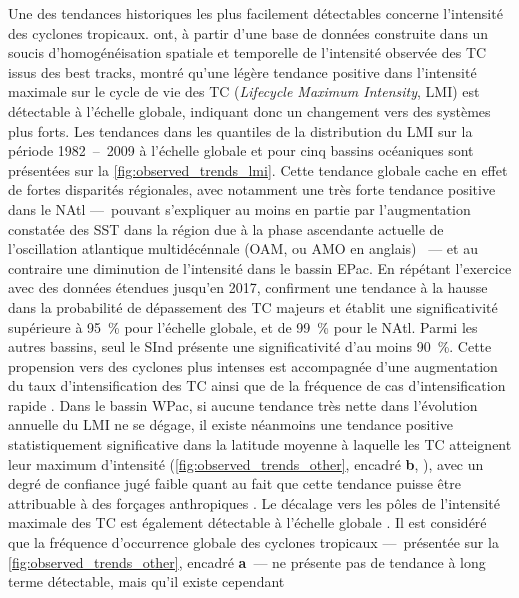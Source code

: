 \documentclass[../main.tex]{subfiles}
\begin{document}
Une des tendances historiques les plus facilement détectables concerne l'intensité des cyclones tropicaux. \textcite{kossin_trend_2013} ont, à partir d'une base
de données construite dans un soucis d'homogénéisation spatiale et temporelle de l'intensité observée des TC issus des best tracks, montré qu'une légère
tendance positive dans l'intensité maximale sur le cycle de vie des TC (\textit{Lifecycle Maximum Intensity}, LMI) est détectable à l'échelle globale, indiquant
donc un changement vers des systèmes plus forts. Les tendances dans les quantiles de la distribution du LMI sur la période \num{1982}~--~\num{2009} à l'échelle
globale et pour cinq bassins océaniques sont présentées sur la \cref{fig:observed_trends_lmi}. Cette tendance globale cache en effet de fortes disparités
régionales, avec notamment une très forte tendance positive dans le NAtl ---~pouvant s'expliquer au moins en partie par l'augmentation constatée des SST dans la
région due à la phase ascendante actuelle de l'oscillation atlantique multidécénnale (OAM, ou AMO en anglais) \parencite{ting_forced_2009}~--- et au contraire
une diminution de l'intensité dans le bassin EPac. En répétant l'exercice avec des données étendues jusqu'en \num{2017}, \textcite{kossin_global_2020} confirment
une tendance à la hausse dans la probabilité de dépassement des TC majeurs et établit une significativité supérieure à \SI{95}{\percent} pour l'échelle globale,
et de \SI{99}{\percent} pour le NAtl. Parmi les autres bassins, seul le SInd présente une significativité d'au moins \SI{90}{\percent}. Cette propension vers
des cyclones plus intenses est accompagnée d'une augmentation du taux d'intensification des TC ainsi que de la fréquence de cas d'intensification rapide
\parencite{balaguru_increasing_2018,kishtawal_tropical_2012}. Dans le bassin WPac, si aucune tendance très nette dans l'évolution annuelle du LMI ne se dégage,
il existe néanmoins une tendance positive statistiquement significative dans la latitude moyenne à laquelle les TC atteignent leur maximum d'intensité
(\cref{fig:observed_trends_other}, encadré \textbf{b}, \hbox{\cite{kossin_comment_2018}}), avec un degré de confiance jugé faible quant au  fait que cette
tendance puisse être attribuable à des forçages anthropiques \parencite{knutson_tropical_2019}. Le décalage vers les pôles de l'intensité maximale des TC est
également détectable à l'échelle globale \parencite{kossin_poleward_2014}. Il est considéré que la fréquence d'occurrence globale des cyclones tropicaux
---~présentée sur la \cref{fig:observed_trends_other}, encadré \textbf{a}~--- ne présente pas de tendance à long terme détectable, mais qu'il existe cependant
\end{document}
